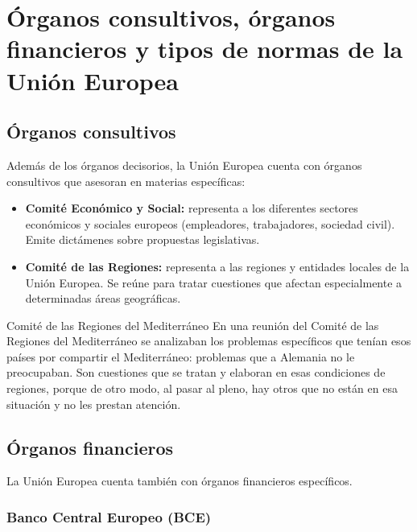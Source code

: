 \documentclass[12pt,oneside]{book}
\begin{document}
\chapter[Órganos consultivos, financieros y normas]{Órganos consultivos, órganos financieros y tipos de normas de la Unión Europea}

\section{Órganos consultivos}

Además de los órganos decisorios, la Unión Europea cuenta con órganos consultivos que asesoran en materias específicas:

\begin{itemize}
    \item \textbf{Comité Económico y Social:} representa a los diferentes sectores económicos y sociales europeos (empleadores, trabajadores, sociedad civil). Emite dictámenes sobre propuestas legislativas.
    \item \textbf{Comité de las Regiones:} representa a las regiones y entidades locales de la Unión Europea. Se reúne para tratar cuestiones que afectan especialmente a determinadas áreas geográficas.
\end{itemize}

\begin{example}{Comité de las Regiones del Mediterráneo}
En una reunión del Comité de las Regiones del Mediterráneo se analizaban los problemas específicos que tenían esos países por compartir el Mediterráneo: problemas que a Alemania no le preocupaban. Son cuestiones que se tratan y elaboran en esas condiciones de regiones, porque de otro modo, al pasar al pleno, hay otros que no están en esa situación y no les prestan atención.
\end{example}

\section{Órganos financieros}

La Unión Europea cuenta también con órganos financieros específicos.

\subsection{Banco Central Europeo (BCE)}
\end{document}
